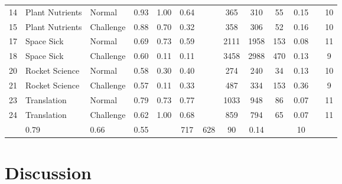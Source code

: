 \documentclass{article}
\begin{document}
\begin{table}[!t]
\begin{tabular}{lllccc c cccccc}
14 & Plant Nutrients & Normal & \cellcolor[HTML]{892eb9}0.93 & \cellcolor[HTML]{1f77b4}1.00 & \cellcolor[HTML]{78c278}0.64 & & 365 & 310 & 55 & 0.15 & & 10 \\ 
\rowcolor[HTML]{E3E3E3} 
15 & Plant Nutrients & Challenge & \cellcolor[HTML]{9039bd}0.88 & \cellcolor[HTML]{62a0ca}0.70 & \cellcolor[HTML]{bce1bc}0.32 & & 358 & 306 & 52 & 0.16 & & 10 \\ \hline
\rowcolor[HTML]{FFFFFF} 
17 & Space Sick & Normal & \cellcolor[HTML]{a864cb}0.69 & \cellcolor[HTML]{5c9cc8}0.73 & \cellcolor[HTML]{82c782}0.59 & & 2111 & 1958 & 153 & 0.08 & & 11 \\ 
\rowcolor[HTML]{FFFFFF} 
18 & Space Sick & Challenge & \cellcolor[HTML]{b379d2}0.60 & \cellcolor[HTML]{e6f0f7}0.11 & \cellcolor[HTML]{e8f5e8}0.11 & & 3458 & 2988 & 470 & 0.13 & & 9 \\ \hline
\rowcolor[HTML]{E3E3E3} 
20 & Rocket Science & Normal & \cellcolor[HTML]{b67dd3}0.58 & \cellcolor[HTML]{bcd6e9}0.30 & \cellcolor[HTML]{abd9ab}0.40 & & 274 & 240 & 34 & 0.13 & & 10 \\ 
\rowcolor[HTML]{E3E3E3} 
21 & Rocket Science & Challenge & \cellcolor[HTML]{b780d4}0.57 & \cellcolor[HTML]{e6f0f7}0.11 & \cellcolor[HTML]{b9e0b9}0.33 & & 487 & 334 & 153 & 0.36 & & 9 \\ \hline
\rowcolor[HTML]{FFFFFF} 
23 & Translation & Normal & \cellcolor[HTML]{9b4ec4}0.79 & \cellcolor[HTML]{5c9cc8}0.73 & \cellcolor[HTML]{5cb65c}0.77 & & 1033 & 948 & 86 & 0.07 & & 11 \\ 
\rowcolor[HTML]{FFFFFF} 
24 & Translation & Challenge & \cellcolor[HTML]{b174d1}0.62 & \cellcolor[HTML]{1f77b4}1.00 & \cellcolor[HTML]{6fbe6f}0.68 & & 859 & 794 & 65 & 0.07 & & 11 \\ 
\midrule
\rowcolor[HTML]{F3F3F3} 
\multicolumn{3}{l}{\textbf{Average (Human)}} &	\cellcolor[HTML]{9d50c4}0.79 &	\cellcolor[HTML]{62a0ca}0.66	& \cellcolor[HTML]{82c782}0.55	& & 717	& 628	& 90	 & 0.14	& & 10\\
\bottomrule
\end{tabular}
\end{table}


\section{Discussion}
\end{document}
